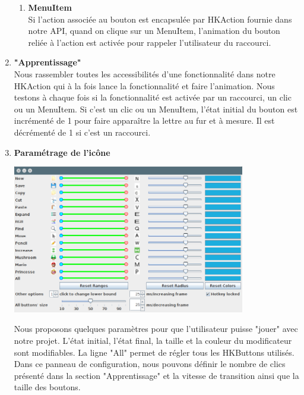 \documentclass[12pt,a4paper]{article}
\begin{document}
\begin{enumerate}
\begin{enumerate}
\item {\large \textbf{MenuItem}}\\
Si l'action associée au bouton est encapsulée par HKAction fournie dans notre API, quand on clique sur un MenuItem, l'animation du bouton reliée à l'action est activée pour rappeler l'utilisateur du raccourci.
\end{enumerate}
\item {\large \textbf{"Apprentissage"}}\\
Nous rassembler toutes les accessibilités d'une fonctionnalité dans notre HKAction qui à la fois lance la fonctionnalité et faire l'animation. Nous testons à chaque fois si la fonctionnalité est activée par un raccourci, un clic ou un MenuItem. Si c'est un clic ou un MenuItem, l'état initial du bouton est incrémenté de 1 pour faire apparaître la lettre au fur et à mesure. Il est décrémenté de 1 si c'est un raccourci. 
\item {\large \textbf{Paramétrage de l'icône}}\\
\begin{center}
	\includegraphics[width=0.8\textwidth]{11.png}
\end{center}
Nous proposons quelques paramètres pour que l'utilisateur puisse "jouer" avec notre projet. L'état initial, l'état final, la taille et la couleur du modificateur sont modifiables. La ligne "All" permet de régler tous les HKButtons utilisés. Dans ce panneau de configuration, nous pouvons définir le nombre de clics présenté dans la section "Apprentissage" et la vitesse de transition ainsi que la taille des boutons.
\end{enumerate}
\end{document}

